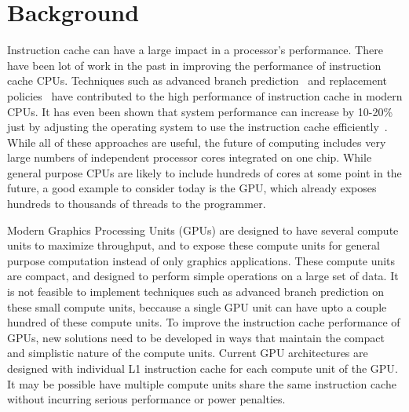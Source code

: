 \section{Background}

Instruction cache can have a large impact in a processor's
performance. 
There have been lot of work in the past in improving the performance
of instruction cache  CPUs. 
Techniques such as advanced branch prediction~\cite{yeh93} and
replacement policies~\cite{smith85} have contributed to the high
performance of instruction cache in modern CPUs. 
It has even been shown that system performance can increase by 10-20\%
just by adjusting the operating system to use the instruction cache
efficiently~\cite{torrellas98}.
While all of these approaches are useful, the future of computing
includes very large numbers of independent processor cores integrated
on one chip.
While general purpose CPUs are likely to include hundreds of cores at
some point in the future, a good example to consider today is the GPU,
which already exposes hundreds to thousands of threads to the
programmer. 

Modern Graphics Processing Units (GPUs) are designed to have several
compute units to maximize throughput, and to expose these compute
units for general purpose computation instead of only graphics
applications.
These compute units are compact, and designed to perform simple
operations on a large set of data. 
It is not feasible to implement techniques such as advanced branch
prediction on these small compute units, beccause a single GPU unit
can have upto a couple hundred of these compute units. 
To improve the instruction cache performance of GPUs, new solutions
need to be developed in ways that maintain the compact and simplistic
nature of the compute units. 
Current GPU architectures are designed with individual L1 instruction
cache for each compute unit of the GPU\cite{keckler11}. 
It may be possible have multiple compute units share the same
instruction cache without incurring serious performance or power
penalties.


